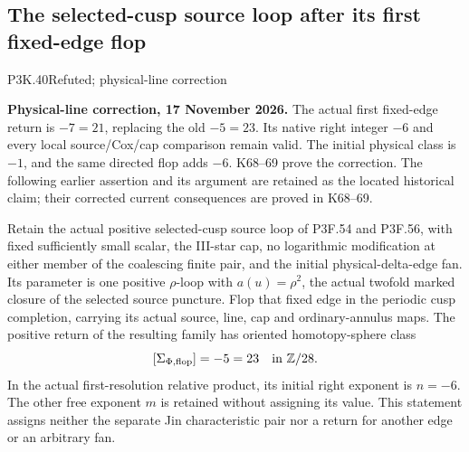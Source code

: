 \subsection{The selected-cusp source loop after its first fixed-edge flop}
\begin{statement}{P3K.40}{Refuted; physical-line correction}\par\noindent\textbf{Physical-line correction, 17 November 2026.} The actual first fixed-edge return is \(-7=21\), replacing the old \(-5=23\). Its native right integer \(-6\) and every local source/Cox/cap comparison remain valid. The initial physical class is \(-1\), and the same directed flop adds \(-6\). K68--69 prove the correction. The following earlier assertion and its argument are retained as the located historical claim; their corrected current consequences are proved in K68--69.\medskip\par 
Retain the actual positive selected-cusp source loop of P3F.54 and
P3F.56, with fixed sufficiently small scalar, the III-star cap, no
logarithmic modification at either member of the coalescing finite
pair, and the initial physical-delta-edge fan. Its parameter is one
positive \(\rho\)-loop with \(a(u)=\rho^2\), the actual twofold
marked closure of the selected source puncture. Flop that fixed edge
in the periodic cusp completion, carrying its actual source, line,
cap and ordinary-annulus maps. The positive return of the resulting
family has oriented homotopy-sphere class
\[
                 [\Sigma_{\Phi,\mathrm{flop}}]
                     =-5=23\quad\hbox{in }\mathbb Z/28.
\]
In the actual first-resolution relative product, its initial right
exponent is \(n=-6\). The other free exponent \(m\) is retained
without assigning its value. This statement assigns neither the
separate Jin characteristic pair nor a return for another edge or
an arbitrary fan.
\end{statement}
